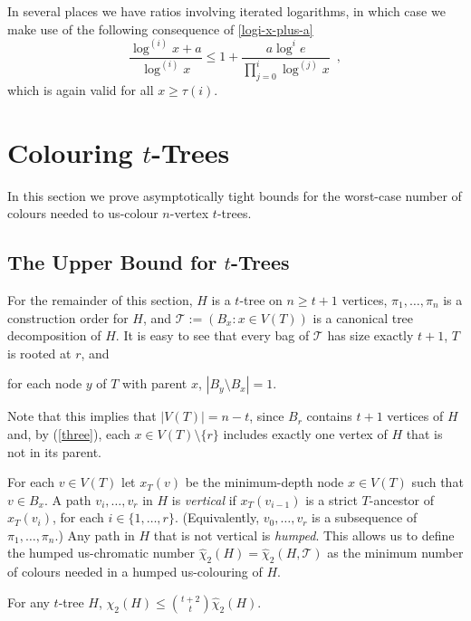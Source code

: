 \documentclass[kpfonts]{patmorin}
\newcommand{\uqs}{\chi_2}
\newcommand{\hus}{\hat{\chi}_2}
\begin{document}
In several places we have ratios involving iterated logarithms, in which case we make use of the following consequence of \cref{logi-x-plus-a}
\begin{equation}
    \frac{\log^{(i)} x+a}{\log^{(i)} x} \le 1 + \frac{a\log^i e}{\prod_{j=0}^{i}\log^{(j)} x} \enspace, \label{logi-ratio}
\end{equation}
which is again valid for all $x\ge \tau(i)$.

\section{Colouring $t$-Trees}

In this section we prove asymptotically tight bounds for the worst-case number of colours needed to us-colour $n$-vertex $t$-trees.

\subsection{The Upper Bound for $t$-Trees}

For the remainder of this section, $H$ is a $t$-tree on $n\ge t+1$ vertices, $\pi_1,\ldots,\pi_n$ is a construction order for $H$, and $\mathcal{T}:=(B_x:x\in V(T))$ is a canonical tree decomposition of $H$.  It is easy to see that every bag of $\mathcal{T}$ has size exactly $t+1$, $T$ is rooted at $r$, and
\begin{inparaenum}[(i)]\setcounter{enumi}{2}
  \item for each node $y$ of $T$ with parent $x$, $|B_y\setminus B_x|=1$.\label{three}
\end{inparaenum}
Note that this implies that $|V(T)|=n-t$, since $B_r$ contains $t+1$ vertices of $H$ and, by (\ref{three}), each $x\in V(T)\setminus\{r\}$ includes exactly one vertex of $H$ that is not in its parent.

For each $v\in V(T)$ let $x_T(v)$ be the minimum-depth node $x\in V(T)$ such that $v\in B_x$.  A path $v_i,\ldots,v_r$ in $H$ is \emph{vertical} if $x_T(v_{i-1})$ is a strict $T$-ancestor of $x_T(v_i)$, for each $i\in\{1,\ldots,r\}$. (Equivalently, $v_0,\ldots,v_r$ is a subsequence of $\pi_1,\ldots,\pi_n$.) Any path in $H$ that is not vertical is \emph{humped}.  This allows us to define the humped us-chromatic number $\hus(H)=\hus(H,\mathcal{T})$ as the minimum number of colours needed in a humped us-colouring of $H$.

\begin{lem}\label{humped}
    For any $t$-tree $H$, $\uqs(H)\le \binom{t+2}{t}\hus(H)$.
\end{lem}
\end{document}
